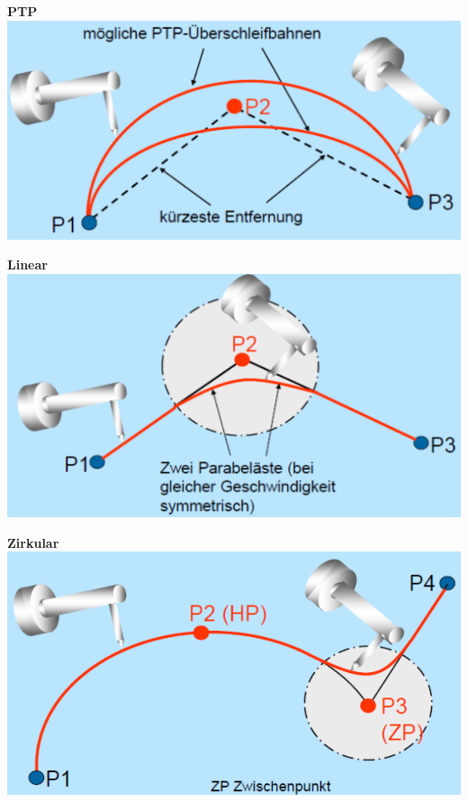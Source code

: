\begin{minipage}{0.345\linewidth}
    \textbf{PTP}\newline
    \includegraphics[width=\linewidth]{./bilder/UeberschleifenPTP.png}
\end{minipage}
\begin{minipage}{0.32\linewidth}
    \textbf{Linear}\newline
    \includegraphics[width=\linewidth]{./bilder/UeberschleifenLin.png}
\end{minipage}
\begin{minipage}{0.32\linewidth}
    \textbf{Zirkular}\newline
    \includegraphics[width=\linewidth]{./bilder/UeberschleifenCirc.png}
\end{minipage}

